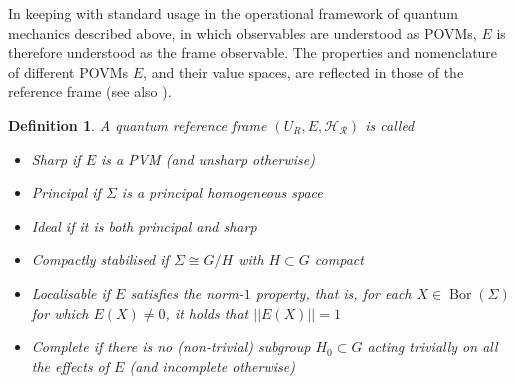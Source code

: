 \documentclass[sn-mathphys-num]{sn-jnl}%
\DeclareMathOperator{\Bor}{Bor}
\numberwithin{equation}{section}
\theoremstyle{thmstyleone}%
\theoremstyle{thmstyletwo}%
\theoremstyle{thmstylethree}%
\newtheorem{definition}[theorem]{Definition}%
\begin{document}
 In keeping with standard usage in the operational framework of quantum mechanics described above, in which observables are understood as POVMs, $E$ is therefore understood as the frame observable. The properties and nomenclature of different POVMs $E$, and their value spaces, are reflected in those of the reference frame (see also \cite{carette2023operational}).
 
 \begin{definition}\label{def:QRF types} A quantum reference frame $(U_R,E,\mathcal{H_R})$ is called 
 \begin{itemize}
     \item Sharp if $E$ is a PVM (and unsharp otherwise)
     \item Principal if $\Sigma$ is a principal homogeneous space
     \item Ideal if it is both principal and sharp
     \item Compactly stabilised if $\Sigma \cong G/H$ with $H \subset G$ compact
     \item Localisable if $E$ satisfies the norm-$1$ property, that is, for each $X \in \Bor(\Sigma)$ for which $E(X)\neq 0$, it holds that $||E(X)||=1$
     \item Complete if there is no (non-trivial) subgroup $H_0 \subset G$ acting trivially on all the effects of $E$ (and incomplete otherwise)
 \end{itemize}
 \end{definition}
\end{document}
